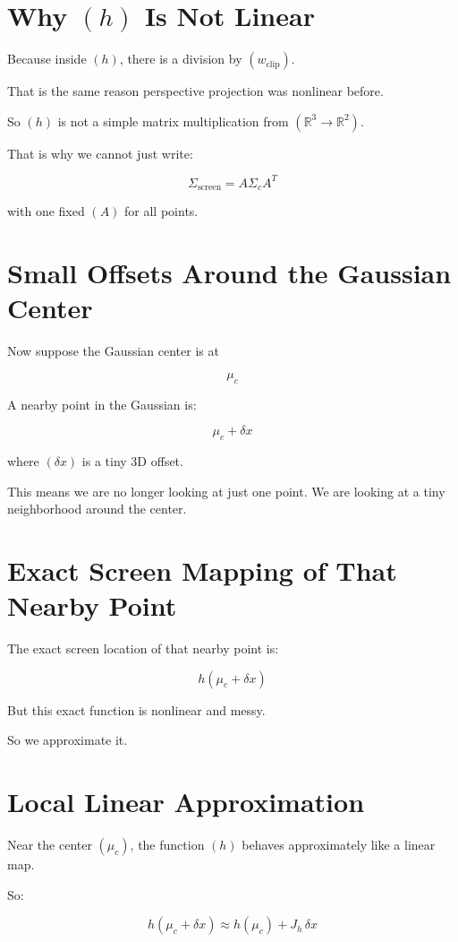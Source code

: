 \documentclass[11pt,letterpaper]{article}
\begin{document}
\section{Why \texorpdfstring{$(h)$}{(h)} Is Not Linear}

Because inside $(h)$, there is a division by $(w_{\text{clip}})$.

That is the same reason perspective projection was nonlinear before.

So $(h)$ is not a simple matrix multiplication from $(\mathbb{R}^3 \to \mathbb{R}^2)$.

That is why we cannot just write:

\[
\Sigma_{\text{screen}} = A \Sigma_c A^T
\]

with one fixed $(A)$ for all points.

\section{Small Offsets Around the Gaussian Center}

Now suppose the Gaussian center is at

\[
\mu_c
\]

A nearby point in the Gaussian is:

\[
\mu_c + \delta x
\]

where $(\delta x)$ is a tiny 3D offset.

This means we are no longer looking at just one point. We are looking at a tiny neighborhood around the center.

\section{Exact Screen Mapping of That Nearby Point}

The exact screen location of that nearby point is:

\[
h(\mu_c + \delta x)
\]

But this exact function is nonlinear and messy.

So we approximate it.

\section{Local Linear Approximation}

Near the center $(\mu_c)$, the function $(h)$ behaves approximately like a linear map.

So:

\[
h(\mu_c + \delta x) \approx h(\mu_c) + J_h \, \delta x
\]
\end{document}
